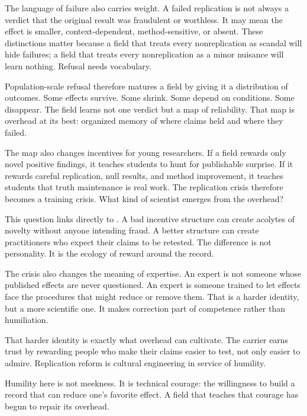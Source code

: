 The language of failure also carries weight. A failed replication is not
always a verdict that the original result was fraudulent or worthless. It may mean the
effect is smaller, context-dependent, method-sensitive, or absent. These
distinctions matter because a field that treats every nonreplication as
scandal will hide failures; a field that treats every nonreplication as a
minor nuisance will learn nothing. Refusal needs vocabulary.

Population-scale refusal therefore matures a field by giving it a distribution
of outcomes. Some effects survive. Some shrink. Some depend on conditions.
Some disappear. The field learns not one verdict but a map of reliability.
That map is overhead at its best: organized memory of where claims held and
where they failed.

The map also changes incentives for young researchers. If a field rewards only
novel positive findings, it teaches students to hunt for publishable surprise.
If it rewards careful replication, null results, and method improvement, it
teaches students that truth maintenance is real work. The replication crisis
therefore becomes a training crisis. What kind of scientist emerges from the
overhead?

This question links directly to . A bad incentive structure can
create acolytes of novelty without anyone intending fraud. A better structure
can create practitioners who expect their claims to be retested. The
difference is not personality. It is the ecology of reward around the record.

The crisis also changes the meaning of expertise. An expert is not someone
whose published effects are never questioned. An expert is someone trained to
let effects face the procedures that might reduce or remove them. That is a
harder identity, but a more scientific one. It makes correction part of
competence rather than humiliation.

That harder identity is exactly what overhead can cultivate. The carrier
earns trust by rewarding people who make their claims easier to test, not
only easier to admire. Replication reform is cultural engineering in service of humility.

Humility here is not meekness. It is technical courage: the willingness to
build a record that can reduce one's favorite effect. A field that teaches
that courage has begun to repair its overhead.

